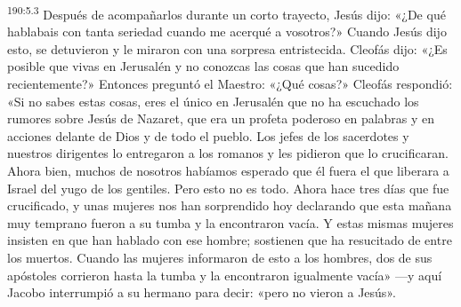 \par 
\textsuperscript{190:5.3} Después de acompañarlos durante un corto trayecto, Jesús dijo: «¿De qué hablabais con tanta seriedad cuando me acerqué a vosotros?» Cuando Jesús dijo esto, se detuvieron y le miraron con una sorpresa entristecida. Cleofás dijo: «¿Es posible que vivas en Jerusalén y no conozcas las cosas que han sucedido recientemente?» Entonces preguntó el Maestro: «¿Qué cosas?» Cleofás respondió: «Si no sabes estas cosas, eres el único en Jerusalén que no ha escuchado los rumores sobre Jesús de Nazaret, que era un profeta poderoso en palabras y en acciones delante de Dios y de todo el pueblo. Los jefes de los sacerdotes y nuestros dirigentes lo entregaron a los romanos y les pidieron que lo crucificaran. Ahora bien, muchos de nosotros habíamos esperado que él fuera el que liberara a Israel del yugo de los gentiles. Pero esto no es todo. Ahora hace tres días que fue crucificado, y unas mujeres nos han sorprendido hoy declarando que esta mañana muy temprano fueron a su tumba y la encontraron vacía. Y estas mismas mujeres insisten en que han hablado con ese hombre; sostienen que ha resucitado de entre los muertos. Cuando las mujeres informaron de esto a los hombres, dos de sus apóstoles corrieron hasta la tumba y la encontraron igualmente vacía» ---y aquí Jacobo interrumpió a su hermano para decir: «pero no vieron a Jesús».

